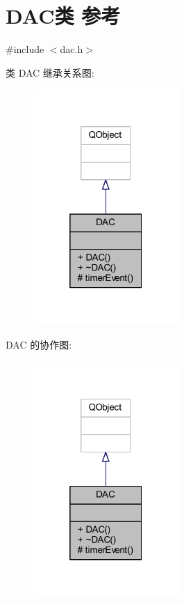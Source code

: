 \hypertarget{class_d_a_c}{}\section{D\+A\+C类 参考}
\label{class_d_a_c}


{\ttfamily \#include $<$dac.\+h$>$}



类 D\+AC 继承关系图\+:
\nopagebreak
\begin{figure}[H]
\begin{center}
\leavevmode
\includegraphics[width=157pt]{class_d_a_c__inherit__graph}
\end{center}
\end{figure}


D\+AC 的协作图\+:
\nopagebreak
\begin{figure}[H]
\begin{center}
\leavevmode
\includegraphics[width=157pt]{class_d_a_c__coll__graph}
\end{center}
\end{figure}
